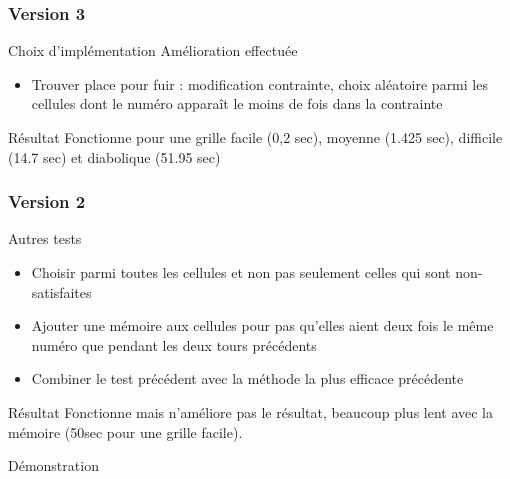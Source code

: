 \begin{frame}
    \frametitle{Version 3}
    \begin{block}{Choix d'implémentation}
    		Amélioration effectuée
    		\begin{itemize}
    			\item Trouver place pour fuir : modification contrainte, choix aléatoire parmi les cellules dont le numéro apparaît le moins de fois dans la contrainte
    		\end{itemize}
    \end{block}
    \pause
    \begin{alertblock}{Résultat}
    		Fonctionne pour une grille facile (0,2 sec), moyenne (1.425 sec), difficile (14.7 sec) et diabolique (51.95 sec)
    \end{alertblock}
\end{frame}


\begin{frame}
    \frametitle{Version 2}
    \begin{exampleblock}{Autres tests}
   		 \begin{itemize}
    				\item Choisir parmi toutes les cellules et non pas seulement celles qui sont non-satisfaites
    		 \pause
    				\item Ajouter une mémoire aux cellules pour pas qu'elles aient deux fois le même numéro que pendant les deux tours précédents 
		 \pause
				\item Combiner le test précédent avec la méthode la plus efficace précédente
		 \end{itemize}
	\end{exampleblock}
	\pause
	\begin{alertblock}{Résultat}
		Fonctionne mais n'améliore pas le résultat, beaucoup plus lent avec la mémoire (50sec pour une grille facile).
    \end{alertblock}
\end{frame}

\begin{frame}
	Démonstration
\end{frame}